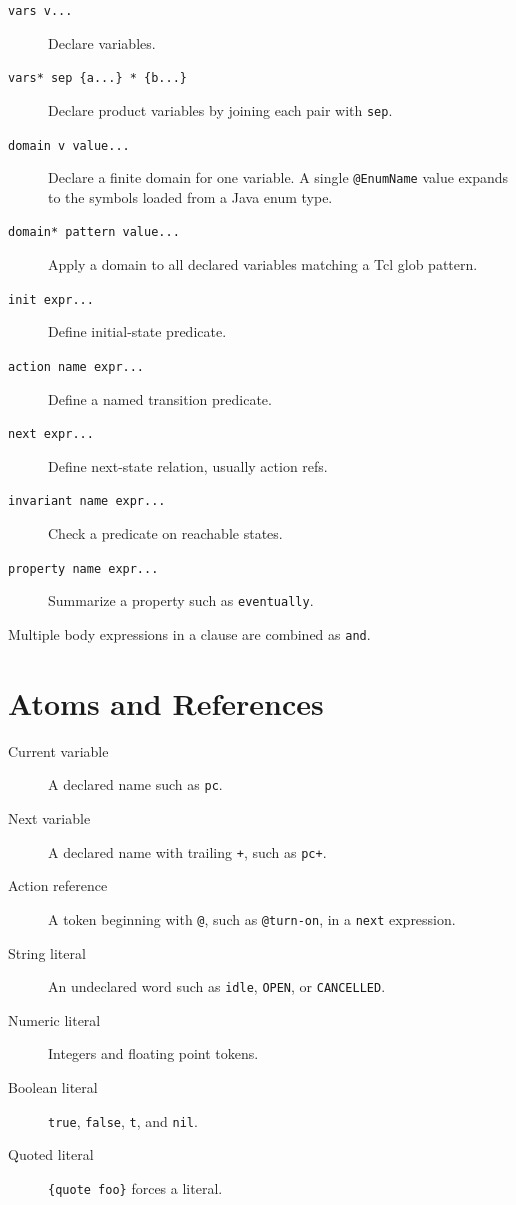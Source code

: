 \documentclass[11pt]{article}
\begin{document}
\begin{description}
\item[\texttt{vars v...}] Declare variables.
\item[\texttt{vars* sep \{a...\} * \{b...\}}] Declare product variables by
  joining each pair with \texttt{sep}.
\item[\texttt{domain v value...}] Declare a finite domain for one variable.  A
  single \texttt{@EnumName} value expands to the symbols loaded from a Java enum
  type.
\item[\texttt{domain* pattern value...}] Apply a domain to all declared
  variables matching a Tcl glob pattern.
\item[\texttt{init expr...}] Define initial-state predicate.
\item[\texttt{action name expr...}] Define a named transition predicate.
\item[\texttt{next expr...}] Define next-state relation, usually action refs.
\item[\texttt{invariant name expr...}] Check a predicate on reachable states.
\item[\texttt{property name expr...}] Summarize a property such as
  \texttt{eventually}.
\end{description}

Multiple body expressions in a clause are combined as \texttt{and}.

\section{Atoms and References}

\begin{description}
\item[Current variable] A declared name such as \texttt{pc}.
\item[Next variable] A declared name with trailing \texttt{+}, such as
  \texttt{pc+}.
\item[Action reference] A token beginning with \texttt{@}, such as
  \texttt{@turn-on}, in a \texttt{next} expression.
\item[String literal] An undeclared word such as \texttt{idle}, \texttt{OPEN},
  or \texttt{CANCELLED}.
\item[Numeric literal] Integers and floating point tokens.
\item[Boolean literal] \texttt{true}, \texttt{false}, \texttt{t}, and
  \texttt{nil}.
\item[Quoted literal] \texttt{\{quote foo\}} forces a literal.
\end{description}
\end{document}
